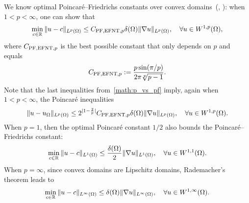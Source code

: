 \documentclass[10pt,letterpaper]{article}
\newcommand\cye[1]{%
  \protect\leavevmode
  \begingroup
    \color{red!35!yellow}%
    #1%
  \endgroup
}
\begin{document}
We know optimal Poincar\'e--Friedrichs constants over convex domains~(\cite[Theorem~1.1]{ferone2012remark}, \cite[Theorem~1.1]{esposito2013poincare}): 
when $1 < p < \infty$, one can show that 
\begin{align}\label{math:esposito:pf}
    \min\limits_{ c \in {\mathbb R} }
    \| u - c \|_{L^{p}(\Omega)}
    \leq 
    C_{{\rm PF},{\rm EFNT},p}
    {\delta}(\Omega)
    \| \nabla u \|_{L^{p}(\Omega)}
    ,
    \quad 
    \forall 
    u \in W^{1,p}(\Omega)
    ,
\end{align}
where $C_{{\rm PF},{\rm EFNT},p}$ is the best possible constant that only depends on $p$ and equals 
\begin{align*}
    C_{{\rm PF},{\rm EFNT},p}
    :=
    \frac{ p \sin(\pi/p) }{ 2\pi \sqrt[p]{p-1} }
    .
\end{align*}
Note that the last inequalities \cye{from~\eqref{math:p_vs_pf}} imply, again when $1 < p < \infty$, the Poincar\'e inequalities
\begin{align}\label{math:esposito:poincare}
    \| u - u_{\Omega} \|_{L^{p}(\Omega)}
    \leq 
    2^{|1-\frac 2 p|}C_{{\rm PF},{\rm EFNT},p}
    {\delta}(\Omega)
    \| \nabla u \|_{L^{p}(\Omega)}
    ,
    \quad 
    \forall 
    u \in W^{1,p}(\Omega)
    .
\end{align}
When $p=1$, then the optimal Poincar\'e constant $1/2$ also bounds the Poincar\'e--Friedrichs constant:
\begin{align}\label{math:l1estimate}
    \min\limits_{ c \in {\mathbb R} }
    \| u - c \|_{L^{1}(\Omega)}
    \leq 
    \frac{ {\delta}(\Omega) }{2}
    \| \nabla u \|_{L^{1}(\Omega)}
    ,
    \quad 
    \forall 
    u \in W^{1,1}(\Omega)
    .
\end{align}
When $p=\infty$, since convex domains are Lipschitz domains, Rademacher's theorem leads to 
\begin{align}\label{math:lipschitzestimate}
    \min\limits_{ c \in {\mathbb R} }
    \| u - c \|_{L^{\infty}(\Omega)}
    \leq 
    {\delta}(\Omega)
    \| \nabla u \|_{L^{\infty}(\Omega)}
    ,
    \quad 
    \forall 
    u \in W^{1,\infty}(\Omega)
    .
\end{align}

\end{document}
